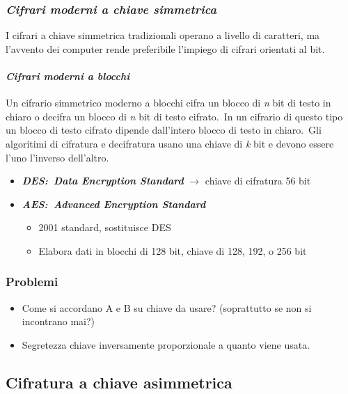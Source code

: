 \subsubsection{\textit{Cifrari moderni a chiave simmetrica}}

I cifrari a chiave simmetrica tradizionali operano a livello di caratteri, ma l'avvento dei computer rende preferibile l'impiego di cifrari orientati al bit.

\paragraph{\textit{Cifrari moderni a blocchi}} Un cifrario simmetrico moderno a blocchi cifra un blocco di \textit{n} bit di testo in chiaro o decifra un blocco di \textit{n} bit di testo cifrato.\
In un cifrario di questo tipo un blocco di testo cifrato dipende dall'intero blocco di testo in chiaro.\
Gli algoritimi di cifratura e decifratura usano una chiave di \textit{k} bit e devono essere l'uno l'inverso dell'altro.

\begin{itemize}
    \item \textbf{\textit{DES:\ Data Encryption Standard}} $\rightarrow$ chiave di cifratura 56 bit
    \item \textbf{\textit{AES:\ Advanced Encryption Standard}}
          \begin{itemize}
              \item 2001 standard, sostituisce DES
              \item Elabora dati in blocchi di 128 bit, chiave di 128, 192, o 256 bit
          \end{itemize}
\end{itemize}

\subsubsection{Problemi}

\begin{itemize}
    \item Come si accordano A e B su chiave da usare? (soprattutto se non si incontrano mai?)
    \item Segretezza chiave inversamente proporzionale a quanto viene usata.
\end{itemize}

\subsection{Cifratura a chiave asimmetrica}


